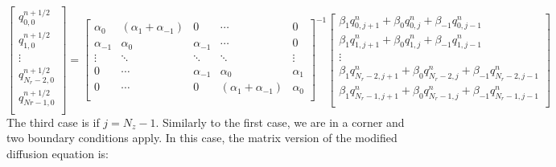 \documentclass[11pt]{article} %
\begin{document}
\[  \begin{bmatrix}
q_{0,0}^{n+1/2} \\[0.5em]
q_{1,0}^{n+1/2} \\[0.5em]
\vdots \\[0.5em]
q_{N_r-2,0}^{n+1/2} \\[0.5em]
q_{Nr-1,0}^{n+1/2} \\[0.5em]
\end{bmatrix} = 
%
\begin{bmatrix}
\alpha_0 & (\alpha_1+\alpha_{-1}) & 0 & \cdots & 0 \\[0.5em]
\alpha_{-1} & \alpha_0 & \alpha_{-1} &\cdots &0 \\[0.5em]
\vdots & \ddots & \ddots & \ddots & \vdots \\[0.5em]
0 & \cdots & \alpha_{-1} & \alpha_0 & \alpha_1  \\[0.5em]
0 & \cdots & 0 & (\alpha_1+\alpha_{-1}) & \alpha_0 \\[0.5em]
\end{bmatrix}^{-1} 
%
\begin{bmatrix}
\beta_1q_{0,j+1}^{n}+ \beta_0q_{0,j}^{n} + \beta_{-1}q_{0,j-1}^{n}  \\[0.5em]
\beta_1q_{1,j+1}^{n}+ \beta_0q_{1,j}^{n} + \beta_{-1}q_{1,j-1}^{n}   \\[0.5em]
\vdots \\[0.5em]
\beta_1q_{N_r-2,j+1}^{n}+ \beta_0q_{N_r-2,j}^{n} + \beta_{-1}q_{N_r-2,j-1}^{n}  \\[0.5em]
\beta_1q_{N_r-1,j+1}^{n}+ \beta_0q_{N_r-1,j}^{n} + \beta_{-1}q_{N_r-1,j-1}^{n} \\[0.5em]
\end{bmatrix}
\]
\noindent
The third case is if $j=N_z-1$. Similarly to the first case, we are in a corner and two boundary conditions apply. In this case, the matrix version of the modified diffusion equation is:
\end{document}
